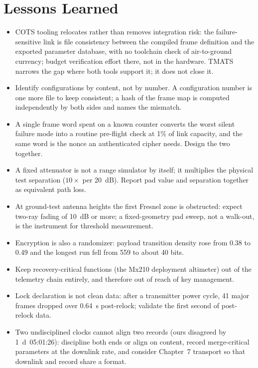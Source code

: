 \documentclass[12pt,letterpaper]{article}
\begin{document}
\section{Lessons Learned}\label{sec:lessons}

\begin{itemize}
  \item COTS tooling relocates rather than removes integration risk: the failure-sensitive
  link is file consistency between the compiled frame definition and the exported parameter
  database, with no toolchain check of air-to-ground currency; budget verification effort
  there, not in the hardware. TMATS narrows the gap where both tools support it; it does
  not close it.
  \item Identify configurations by content, not by number. A configuration number is one
  more file to keep consistent; a hash of the frame map is computed independently by both
  sides and names the mismatch.
  \item A single frame word spent on a known counter converts the worst silent failure mode
  into a routine pre-flight check at 1\% of link capacity, and the same word is the nonce an
  authenticated cipher needs. Design the two together.
  \item A fixed attenuator is not a range simulator by itself; it multiplies the physical
  test separation ($10\times$ per 20~dB). Report pad value and separation together as
  equivalent path loss.
  \item At ground-test antenna heights the first Fresnel zone is obstructed: expect two-ray
  fading of 10~dB or more; a fixed-geometry pad sweep, not a walk-out, is the instrument for
  threshold measurement.
  \item Encryption is also a randomizer: payload transition density rose from 0.38 to 0.49
  and the longest run fell from 559 to about 40 bits.
  \item Keep recovery-critical functions (the Mx210 deployment altimeter) out of the
  telemetry chain entirely, and therefore out of reach of key management.
  \item Lock declaration is not clean data: after a transmitter power cycle, 41 major frames
  dropped over 0.64~s post-relock; validate the first second of post-relock data.
  \item Two undisciplined clocks cannot align two records (ours disagreed by 1~d~05:01:26):
  discipline both ends or align on content, record merge-critical parameters at the downlink
  rate, and consider Chapter~7 transport so that downlink and record share a format.
\end{itemize}
\end{document}
